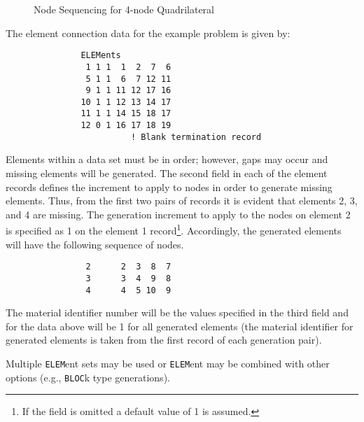 \begin{figure}[ht!]
\epsfxsize=2.8in
\centerline {\hfil {} \hfil}
\caption{Node Sequencing for 4-node Quadrilateral}
\label{fig4a}
\end{figure}

The element connection data for the example problem is given by:
\begin{verbatim}
               ELEMents
                1 1 1  1  2  7  6
                5 1 1  6  7 12 11
                9 1 1 11 12 17 16
               10 1 1 12 13 14 17
               11 1 1 14 15 18 17
               12 0 1 16 17 18 19
                         ! Blank termination record
\end{verbatim}
Elements within a data set must be in order; however, gaps may occur
and missing elements will be generated.
The second field in each of the element records defines the
increment to apply to nodes in order to generate missing elements.  Thus,
from the first two pairs of records it is evident that elements 2, 3, and 4
are missing.  The generation increment to apply to the nodes on element 2 is
specified as 1 on the element 1 record\footnote{If the field is
omitted a default value of 1 is assumed.}.
Accordingly, the generated elements
will have the following sequence of nodes.
\begin{verbatim}
                2      2  3  8  7
                3      3  4  9  8
                4      4  5 10  9
\end{verbatim}
The material identifier
number will be the values specified in the third field and
for the data above will be 1 for all generated elements (the material
identifier for generated elements
is taken from the first record of each generation pair).

Multiple {\tt ELEM}ent sets may be used or {\tt ELEM}ent may be combined
with other options (e.g., {\tt BLOC}k type generations).

